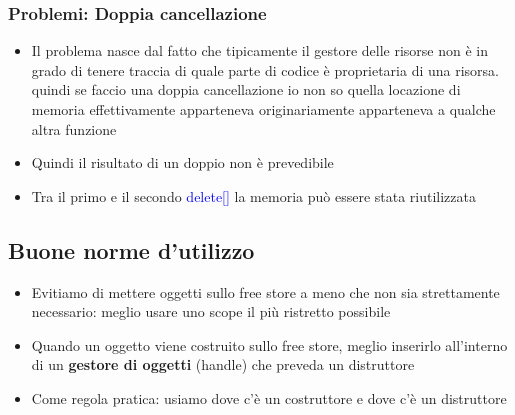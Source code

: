 \subsubsection{Problemi: Doppia cancellazione}
\begin{itemize}
    \item Il problema nasce dal fatto che tipicamente il gestore delle
    risorse non è in grado di tenere traccia di quale parte di codice è proprietaria di una risorsa. quindi se faccio una doppia cancellazione io non so quella locazione di memoria effettivamente apparteneva originariamente apparteneva a qualche altra funzione
    \item Quindi il risultato di un doppio \textcolor{blue}{} non è prevedibile
    
    \item Tra il primo e il secondo \textcolor{blue}{delete[]} la memoria può essere stata riutilizzata
\end{itemize}

\subsection{Buone norme d'utilizzo}
\begin{itemize}
    \item Evitiamo di mettere oggetti sullo free store a meno che non
    sia strettamente necessario: meglio usare uno scope il più
    ristretto possibile
    \item Quando un oggetto viene costruito sullo free store, meglio
    inserirlo all’interno di un \textbf{gestore di oggetti} (handle) che
    preveda un distruttore
    \item Come regola pratica: usiamo \textcolor{blue}{} dove c’è un costruttore e
    \textcolor{blue}{} dove c’è un distruttore
\end{itemize}

